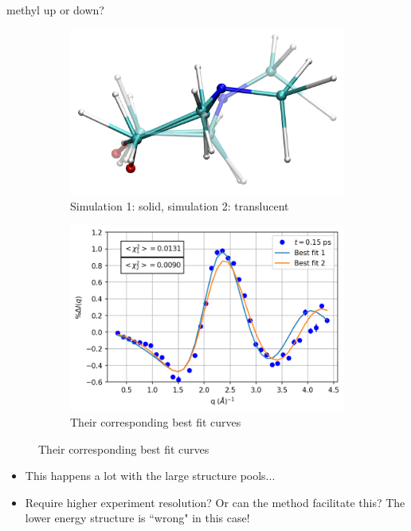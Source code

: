\documentclass{beamer}
\begin{document}
\begin{frame}{methyl up or down?}
	\vspace{-5mm}
	\begin{figure}
		\centering
		\begin{subfigure}[b]{0.45\textwidth}
			\centering
			\includegraphics[width=\textwidth]{allmodes_1m_2m_frame10_comparison.png}
			\caption{Simulation 1: solid, simulation 2: translucent}
		\end{subfigure}
		\begin{subfigure}[b]{0.45\textwidth}
			\centering
			\includegraphics[width=\textwidth]{figures/2000000_allmodes_0.15_comparison.png}
			\caption{Their corresponding best fit curves}
		\end{subfigure}
	\end{figure}
	\begin{itemize}
		\item This happens a lot with the large structure pools...
		\item Require higher experiment resolution? Or can the method facilitate this? The lower energy structure is ``wrong" in this case!
	\end{itemize}
\end{frame}
\end{document}
